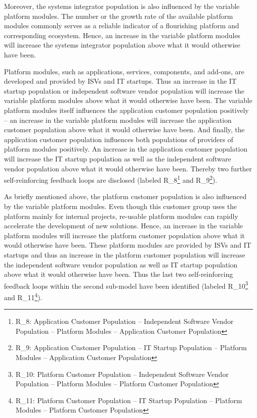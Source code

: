 Moreover, the systems integrator population is also influenced by the variable platform modules. The number or the growth rate of the available platform modules commonly serves as a reliable indicator of a flourishing platform and corresponding ecosystem. Hence, an increase in the variable platform modules will increase the systems integrator population above what it would otherwise have been.

Platform modules, such as applications, services, components, and add-ons, are developed and provided by \acp{ISV} and \ac{IT} startups. Thus an increase in the \ac{IT} startup population or independent software vendor population will increase the variable platform modules above what it would otherwise have been. The variable platform modules itself influences the application customer population positively -- an increase in the variable platform modules will increase the application customer population above what it would otherwise have been. And finally, the application customer population influences both populations of providers of platform modules positively. An increase in the application customer population will increase the \ac{IT} startup population as well as the independent software vendor population above what it would otherwise have been. Thereby two further self-reinforcing feedback loops are disclosed (labeled R\_8\footnote{R\_8: Application Customer Population -- Independent Software Vendor Population -- Platform Modules -- Application Customer Population} and R\_9\footnote{R\_9: Application Customer Population -- \ac{IT} Startup Population -- Platform Modules -- Application Customer Population}).

As briefly mentioned above, the platform customer population is also influenced by the variable platform modules. Even though this customer group uses the platform mainly for internal projects, re-usable platform modules can rapidly accelerate the development of new solutions. Hence, an increase in the variable platform modules will increase the platform customer population above what it would otherwise have been. These platform modules are provided by \acp{ISV} and \ac{IT} startups and thus an increase in the platform customer population will increase the independent software vendor population as well as \ac{IT} startup population above what it would otherwise have been. Thus the last two self-reinforcing feedback loops within the second sub-model have been identified (labeled R\_10\footnote{R\_10: Platform Customer Population -- Independent Software Vendor Population -- Platform Modules -- Platform Customer Population} and R\_11\footnote{R\_11: Platform Customer Population -- \ac{IT} Startup Population -- Platform Modules -- Platform Customer Population}).

